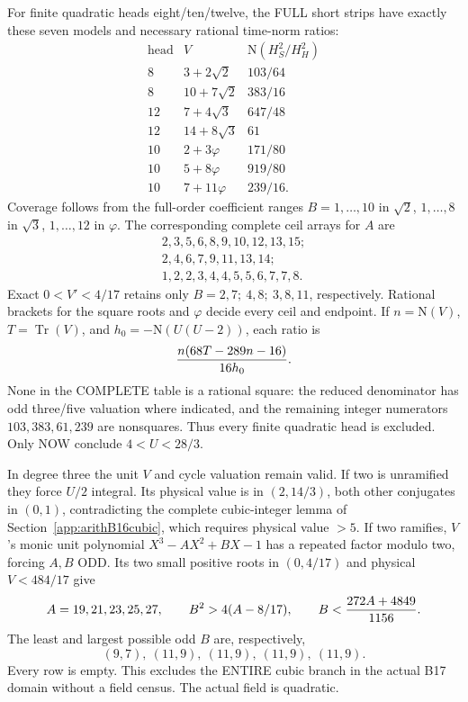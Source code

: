 For finite quadratic heads eight/ten/twelve,
the FULL short strips have exactly these seven
models and necessary rational time-norm ratios:
\[
\begin{array}{c|c|c}
 \text{head}&V&
 \mathrm N(H_S^2/H_H^2)\\ \hline
8&3+2\sqrt2&103/64\\
8&10+7\sqrt2&383/16\\
12&7+4\sqrt3&647/48\\
12&14+8\sqrt3&61\\
10&2+3\varphi&171/80\\
10&5+8\varphi&919/80\\
10&7+11\varphi&239/16 .
\end{array}
\]
Coverage follows from the full-order coefficient
ranges \(B=1,\ldots,10\) in \(\sqrt2\),
\(1,\ldots,8\) in \(\sqrt3\),
\(1,\ldots,12\) in \(\varphi\).
The corresponding complete ceil arrays for \(A\) are
\[
 \begin{gathered}
 2,3,5,6,8,9,10,12,13,15;\\
 2,4,6,7,9,11,13,14;\\
 1,2,2,3,4,4,5,5,6,7,7,8 .
 \end{gathered}
\]
Exact \(0<V'<4/17\) retains only
\(B=2,7;\ 4,8;\ 3,8,11\), respectively.
Rational brackets for the square roots and
\(\varphi\) decide every ceil and endpoint.
If \(n=\mathrm N(V)\), \(T=\operatorname{Tr}(V)\),
and \(h_0=-\mathrm N(U(U-2))\), each ratio is
\[
                     {n(68T-289n-16)\over16h_0}.
\]
None in the COMPLETE table is a rational square:
the reduced denominator has odd three/five
valuation where indicated, and the remaining
integer numerators \(103,383,61,239\) are
nonsquares.
Thus every finite quadratic head is excluded.
Only NOW conclude \(4<U<28/3\).

In degree three the unit \(V\) and cycle valuation
remain valid.
If two is unramified they force \(U/2\) integral.
Its physical value is in \((2,14/3)\), both other
conjugates in \((0,1)\), contradicting the
complete cubic-integer lemma of
Section~\ref{app:arithB16cubic}, which requires
physical value \(>5\).
If two ramifies, \(V\)'s monic unit polynomial
\(X^3-AX^2+BX-1\) has a repeated factor modulo
two, forcing \(A,B\) ODD.
Its two small positive roots in \((0,4/17)\)
and physical \(V<484/17\) give
\[
 A=19,21,23,25,27,\qquad
 B^2>4(A-8/17),\qquad
 B<{272A+4849\over1156}.
\]
The least and largest possible odd \(B\) are,
respectively,
\[
                (9,7),\ (11,9),\ (11,9),\ (11,9),\ (11,9).
\]
Every row is empty.
This excludes the ENTIRE cubic branch in the
actual B17 domain without a field census.
The actual field is quadratic.

